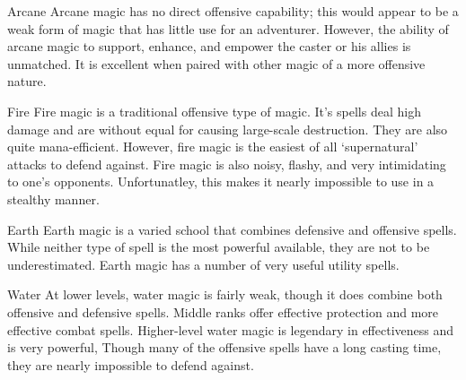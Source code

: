 \documentclass[twoside]{book}
\begin{document}
              
                  Arcane   Arcane magic has no
                  direct offensive capability; this would appear to be a
                  weak form of magic that has little use for an
                  adventurer. However, the ability of arcane magic to
                  support, enhance, and empower the caster or his allies
                  is unmatched. It is excellent when paired with other
                  magic of a more offensive nature.
                
              
                  Fire   Fire magic is a
                  traditional offensive type of magic. It's spells
                  deal high damage and are without equal for causing
                  large-scale destruction. They are also quite
                  mana-efficient. However, fire magic is the easiest of
                  all `supernatural' attacks to defend
                  against. Fire magic is also noisy, flashy, and very
                  intimidating to one's opponents. Unfortunatley,
                  this makes it nearly impossible to use in a stealthy
                  manner.
                
              
                  Earth   Earth magic is a
                  varied school that combines defensive and offensive
                  spells. While neither type of spell is the most
                  powerful available, they are not to be underestimated.
                  Earth magic has a number of very useful utility spells.
                
              
                  Water   At lower levels,
                  water magic is fairly weak, though it does combine both
                  offensive and defensive spells. Middle ranks offer
                  effective protection and more effective combat spells.
                  Higher-level water magic is legendary in effectiveness
                  and is very powerful, Though many of the offensive
                  spells have a long casting time, they are nearly
                  impossible to defend against.
                
            
\end{document}
